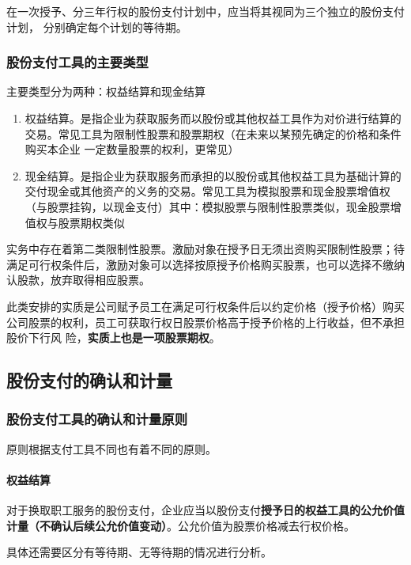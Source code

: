 \documentclass[UTF8,12pt]{ctexart}
\numberwithin{equation}{section} %
\numberwithin{figure}{section}
\numberwithin{table}{section}
\begin{document}
	
	在一次授予、分三年行权的股份支付计划中，应当将其视同为三个独立的股份支付计划， 分别确定每个计划的等待期。
	
	
	\subsubsection{股份支付工具的主要类型}
	
	主要类型分为两种：权益结算和现金结算
	\begin{enumerate}
		\item 权益结算。是指企业为获取服务而以股份或其他权益工具作为对价进行结算的交易。常见工具为限制性股票和股票期权（在未来以某预先确定的价格和条件购买本企业  一定数量股票的权利，更常见）
		
		\item 现金结算。是指企业为获取服务而承担的以股份或其他权益工具为基础计算的交付现金或其他资产的义务的交易。常见工具为模拟股票和现金股票增值权（与股票挂钩，以现金支付）其中：模拟股票与限制性股票类似，现金股票增值权与股票期权类似
		
	\end{enumerate}
	
	实务中存在着第二类限制性股票。激励对象在授予日无须出资购买限制性股票；待满足可行权条件后，激励对象可以选择按原授予价格购买股票，也可以选择不缴纳认股款，放弃取得相应股票。
	
	此类安排的实质是公司赋予员工在满足可行权条件后以约定价格（授予价格）购买公司股票的权利，员工可获取行权日股票价格高于授予价格的上行收益，但不承担股价下行风 险，\textbf{实质上也是一项股票期权}。
	
	
	\subsection{股份支付的确认和计量}
	
	\subsubsection{股份支付工具的确认和计量原则}
	原则根据支付工具不同也有着不同的原则。
	
	\paragraph{权益结算}对于换取职工服务的股份支付，企业应当以股份支付\textbf{授予日的权益工具的公允价值计量（不确认后续公允价值变动）}。公允价值为股票价格减去行权价格。
	
	具体还需要区分有等待期、无等待期的情况进行分析。
	
\end{document}
